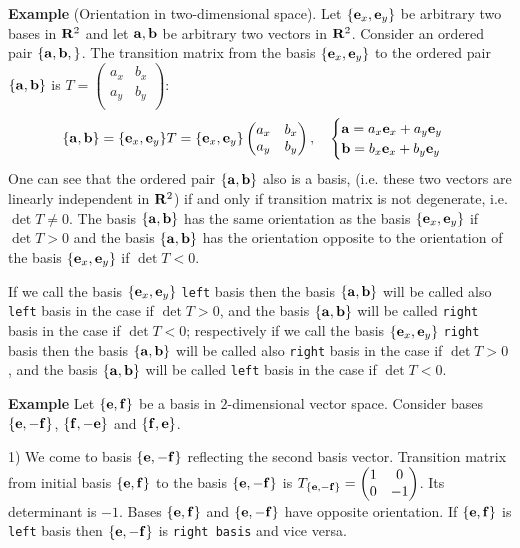 \documentclass[12pt]{article}
\numberwithin{equation}{section}
\begin{document}
{\bf Example} (Orientation in two-dimensional space).
 Let $\{{\bf e}_x,{\bf e}_y\}$ be  arbitrary  two bases in ${\bf R}^2$ and let
 ${\bf a},{\bf b}$ be  arbitrary two vectors in ${\bf R}^2$.
 Consider an ordered pair $\{{\bf a},{\bf b},\}$.
  The transition matrix from the basis $\{{\bf e}_x,{\bf e}_y\}$ to the  ordered pair
  $\{{\bf a},{\bf b}\}$
  is $
           T=
                     \begin{pmatrix}
                 a_x   & b_x   \\
                  a_y   & b_y  \\
                  \end{pmatrix}
                      $:
                      $$
\{{\bf a},{\bf b}\}=\{{\bf e}_x,{\bf e}_y\}T= \{{\bf e}_x,{\bf e}_y\}   \begin{pmatrix}
                 a_x   & b_x   \\
                  a_y   & b_y  \\
                  \end{pmatrix},\quad
                  \begin{cases}
                  {\bf a}=a_x{\bf e}_x+a_y{\bf e}_y\cr
                  {\bf b}=b_x{\bf e}_x+b_y{\bf e}_y\cr
                  \end{cases}
                      $$
One can see that the ordered pair  $\{{\bf a},{\bf b}\}$ also is a basis, (i.e. these two vectors
are  linearly independent in ${\bf R}^2$)
 if and only if  transition matrix is not degenerate, i.e.
 $\det T\not=0$. The  basis  $\{{\bf a},{\bf b}\}$ has the same orientation as the basis $\{{\bf e}_x,{\bf e}_y\}$ if
 $\det T>0$ and  the basis $\{{\bf a},{\bf b}\}$ has the  orientation opposite to the orientation
of the basis $\{{\bf e}_x,{\bf e}_y\}$ if $\det T<0$.

   If we call the basis $\{{\bf e}_x,{\bf e}_y\}$ {\tt left}
basis then the basis $\{{\bf a},{\bf b}\}$ will be called
 also {\tt left} basis in the case if $\det T>0$,
and the basis $\{{\bf a},{\bf b}\}$ will be called
 {\tt right} basis in the case if $\det T<0$;
respectively 
   if we call the basis $\{{\bf e}_x,{\bf e}_y\}$ {\tt right}
basis then the basis $\{{\bf a},{\bf b}\}$ will be called
 also {\tt right} basis in the case if $\det T>0$,
and the basis $\{{\bf a},{\bf b}\}$ will be called
 {\tt left} basis in the case if $\det T<0$.

\m

{\bf Example}  Let $\{{\bf e},{\bf f}\}$ be a basis in $2$-dimensional vector space.
  Consider bases $\{{\bf e},-{\bf f}\}$, $\{{\bf f},-{\bf e}\}$ and $\{{\bf f},{\bf e}\}$.

1) We come to basis $\{{\bf e},-{\bf f}\}$ reflecting the second basis vector.
  Transition matrix from initial basis $\{{\bf e},{\bf f}\}$ to the
basis $\{{\bf e},-{\bf f}\}$ is $T_{\{{\bf e},-{\bf f}\}}=
   \begin{pmatrix} 1&0\cr 0&-1\cr\end{pmatrix}$. Its determinant is $-1$.
   Bases $\{{\bf e},{\bf f}\}$ and $\{{\bf e},-{\bf f}\}$ have opposite orientation.
   If $\{{\bf e},{\bf f}\}$ is {\tt left} basis then
 $\{{\bf e},-{\bf f}\}$ is {\tt right basis} and vice versa.
\end{document}
